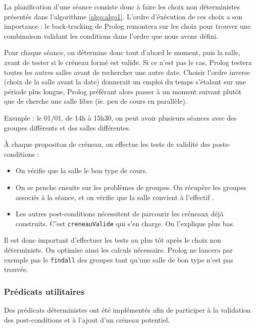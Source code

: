 La planification d'une séance consiste donc à faire les choix non déterministes
présentés dans l'algorithme \ref{algo:algo1}. L'ordre d'éxécution de ces choix
a son importance : le back-tracking de Prolog remontera sur les choix pour
trouver une combinaison validant les conditions dans l'ordre que nous avons
défini.

Pour chaque séance, on détermine donc tout d'abord le moment, puis la salle,
avant de tester si le créneau formé est valide. Si ce n'est pas le cas, Prolog
testera toutes les autres salles avant de rechercher une autre date.
Choisir l'ordre inverse (choix de la salle avant la date) donnerait un emploi du
temps s'étalant sur une période plus longue, Prolog préférant alors passer à un
moment suivant plutôt que de cherche une salle libre (ie. peu de cours en
parallèle).

Exemple : le 01/01, de 14h à 15h30, on peut avoir plusieurs séances avec des
groupes différents et des salles différentes.

À chaque propositon de créneau, on effectue les tests de validité des
posts-conditions :

\begin{itemize}

    \item On vérifie que la salle le bon type de cours.

    \item On se penche ensuite sur les problèmes de groupes. On récupère les
        groupes associés à la séance, et on vérifie que la salle convient à
        l'effectif .

    \item Les autres post-conditions nécessitent de parcourir les créneaux déjà
        construits. C'est \texttt{creneauValide} qui s'en charge. On l'explique
        plus bas.

\end{itemize}

Il est donc important d'effectuer les tests au plus tôt après le choix non
déterministe. On optimise ainsi les calculs nécessaire. Prolog ne lancera par
exemple pas le \texttt{findall} des groupes tant qu'une salle de bon type n'est
pas trouvée.

\subsubsection{Prédicats utilitaires}

Des prédicats déterministes ont été implémentés afin de participer à la
validation des post-conditions et à l'ajout d'un créneau potentiel.

